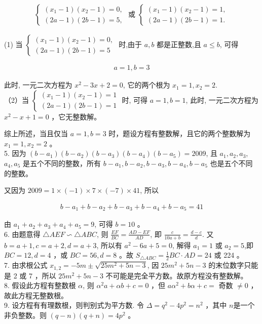 \documentclass[10pt]{article}
\begin{document}
\begin{align*}
\left\{\begin{array} { l } 
{ ( x _ { 1 } - 1 ) ( x _ { 2 } - 1 ) = 0 , } \\
{ ( 2 a - 1 ) ( 2 b - 1 ) = 5 , }
\end{array} \text { 或 } \left\{\begin{array}{l}
\left(x_{1}-1\right)\left(x_{2}-1\right)=1, \\
(2 a-1)(2 b-1)=1 .
\end{array}\right.\right.
\end{align*}

(1) 当 $\left\{\begin{array}{l}\left(x_{1}-1\right)\left(x_{2}-1\right)=0, \\ (2 a-1)(2 b-1)=5\end{array}\right.$ 时,由于 $a, b$ 都是正整数,且 $a \leqslant b$, 可得

\begin{align*}
a=1, b=3
\end{align*}

此时, 一元二次方程为 $x^{2}-3 x+2=0$, 它的两个根为 $x_{1}=1, x_{2}=2$.\\
（2）当 $\left\{\begin{array}{l}\left(x_{1}-1\right)\left(x_{2}-1\right)=1 \\ (2 a-1)(2 b-1)=1\end{array}\right.$ 时, 可得 $a=1, b=1$, 此时, 一元二次方程为 $x^{2}-x+1=0$ ，它无整数解。

综上所述，当且仅当 $a=1, b=3$ 时，题设方程有整数解，且它的两个整数解为 $x_{1}=1, x_{2}=2$ 。\\
5. 因为 $\left(b-a_{1}\right)\left(b-a_{2}\right)\left(b-a_{3}\right)\left(b-a_{4}\right)\left(b-a_{5}\right)=2009$, 且 $a_{1}, a_{2}, a_{3}$, $a_{4}, a_{5}$ 是五个不同的整数，所有 $b-a_{1}, b-a_{2}, b-a_{3}, b-a_{4}, b-a_{5}$ 也是五个不同的整数。

又因为 $2009=1 \times(-1) \times 7 \times(-7) \times 41$, 所以

\begin{align*}
b-a_{1}+b-a_{2}+b-a_{3}+b-a_{4}+b-a_{5}=41
\end{align*}

由 $a_{1}+a_{2}+a_{3}+a_{4}+a_{5}=9$, 可得 $b=10$ 。\\
6. 由题意得 $\triangle A E F \backsim \triangle A B C$, 则 $\frac{E F}{B C}=\frac{A D-E F}{A D}$, 即 $\frac{c}{10 a+b}=\frac{d-c}{d}$. 又 $b=a+1, c=a+2, d=a+3$, 所以有 $a^{2}-6 a+5=0$, 解得 $a_{1}=1$ 或 $a_{2}=5$,即 $B C=12, d=4$ ，或 $B C=56, d=8$ 。故 $S_{\triangle A B C}=\frac{1}{2} B C \cdot A D=24$ 或 224 。\\
7. 由求根公式 $x_{1,2}=-5 m \pm \sqrt{25 m^{2}+5 n-3}$, 因 $25 m^{2}+5 n-3$ 的末位数字只能是 2 或 7 ，所以 $25 m^{2}+5 n-3$ 不可能是完全平方数。故原方程没有整数解。\\
8. 假设此方程有整数根 $\alpha$, 则 $\alpha^{2} a+\alpha b+c=0$ ，但 $a \alpha^{2}+b \alpha+c=$ 奇数 $\neq 0$ ，故此方程无整数根。\\
9. 设方程有有理数根，则判别式为平方数. 令 $\Delta=q^{2}-4 p^{2}=n^{2}$ ，其中 $n$是一个非负整数。则 $(q-n)(q+n)=4 p^{2}$ 。
\end{document}
